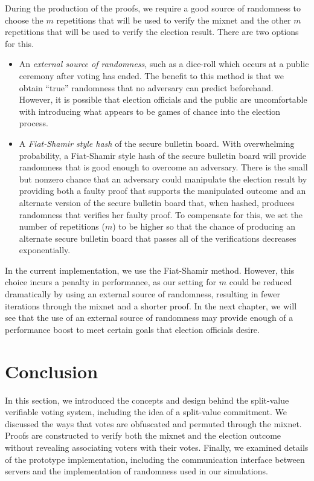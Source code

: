 During the production of the proofs, we require a good source of randomness to choose the $m$ repetitions that will be used to verify the mixnet and the other $m$ repetitions that will be used to verify the election result. There are two options for this.
\begin{itemize}
\item An \emph{external source of randomness}, such as a dice-roll which occurs at a public ceremony after voting has ended. The benefit to this method is that we obtain ``true'' randomness that no adversary can predict beforehand. However, it is possible that election officials and the public are uncomfortable with introducing what appears to be games of chance into the election process.
\item A \emph{Fiat-Shamir style hash} of the secure bulletin board. With overwhelming probability, a Fiat-Shamir style hash of the secure bulletin board will provide randomness that is good enough to overcome an adversary. There is the small but nonzero chance that an adversary could manipulate the election result by providing both a faulty proof that supports the manipulated outcome and an alternate version of the secure bulletin board that, when hashed, produces randomness that verifies her faulty proof. To compensate for this, we set the number of repetitions ($m$) to be higher so that the chance of producing an alternate secure bulletin board that passes all of the verifications decreases exponentially.
\end{itemize}

In the current implementation, we use the Fiat-Shamir method. However, this choice incurs a penalty in performance, as our setting for $m$ could be reduced dramatically by using an external source of randomness, resulting in fewer iterations through the mixnet and a shorter proof. In the next chapter, we will see that the use of an external source of randomness may provide enough of a performance boost to meet certain goals that election officials desire.

\section{Conclusion}

In this section, we introduced the concepts and design behind the split-value verifiable voting system, including the idea of a split-value commitment. We discussed the ways that votes are obfuscated and permuted through the mixnet. Proofs are constructed to verify both the mixnet and the election outcome without revealing associating voters with their votes. Finally, we examined details of the prototype implementation, including the communication interface between servers and the implementation of randomness used in our simulations.

